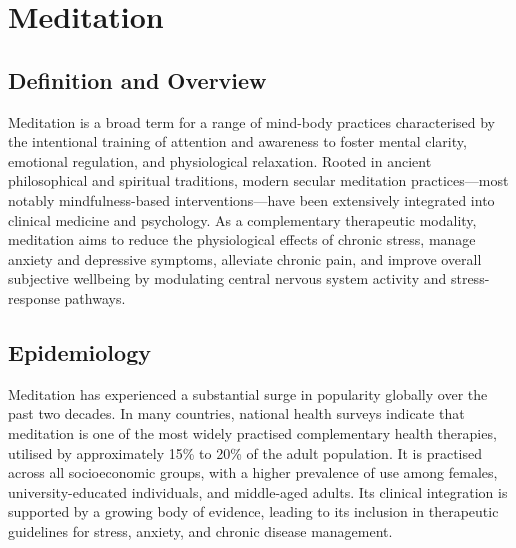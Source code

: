 \chapter{Meditation}

\section*{Definition and Overview}
Meditation is a broad term for a range of mind-body practices characterised by the intentional training of attention and awareness to foster mental clarity, emotional regulation, and physiological relaxation. Rooted in ancient philosophical and spiritual traditions, modern secular meditation practices---most notably mindfulness-based interventions---have been extensively integrated into clinical medicine and psychology. As a complementary therapeutic modality, meditation aims to reduce the physiological effects of chronic stress, manage anxiety and depressive symptoms, alleviate chronic pain, and improve overall subjective wellbeing by modulating central nervous system activity and stress-response pathways.

\section*{Epidemiology}
Meditation has experienced a substantial surge in popularity globally over the past two decades. In many countries, national health surveys indicate that meditation is one of the most widely practised complementary health therapies, utilised by approximately 15\% to 20\% of the adult population. It is practised across all socioeconomic groups, with a higher prevalence of use among females, university-educated individuals, and middle-aged adults. Its clinical integration is supported by a growing body of evidence, leading to its inclusion in therapeutic guidelines for stress, anxiety, and chronic disease management.

